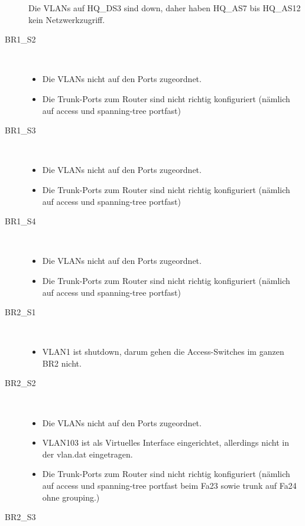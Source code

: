 \begin{description}
	 Die VLANs auf HQ\_DS3 sind down, daher haben HQ\_AS7 bis HQ\_AS12 kein Netzwerkzugriff.
	\item[BR1\_S2] \hfill \\
	  \begin{itemize} 
		  \item Die VLANs nicht auf den Ports zugeordnet.
		  \item Die Trunk-Ports zum Router sind nicht richtig konfiguriert (nämlich auf access und spanning-tree portfast)
	  \end{itemize}
	\item[BR1\_S3] \hfill \\
	  \begin{itemize} 
		  \item Die VLANs nicht auf den Ports zugeordnet. 
		  \item Die Trunk-Ports zum Router sind nicht richtig konfiguriert (nämlich auf access und spanning-tree portfast)
	  \end{itemize}
	\item[BR1\_S4] \hfill \\
	  \begin{itemize} 
		  \item Die VLANs nicht auf den Ports zugeordnet. 
		  \item Die Trunk-Ports zum Router sind nicht richtig konfiguriert (nämlich auf access und spanning-tree portfast)
	  \end{itemize}
	\item[BR2\_S1] \hfill \\
		\begin{itemize}
			\item VLAN1 ist shutdown, darum gehen die Access-Switches im ganzen BR2 nicht.
		\end{itemize}
	\item[BR2\_S2] \hfill \\
	  \begin{itemize}
		  \item Die VLANs nicht auf den Ports zugeordnet.
		  \item VLAN103 ist als Virtuelles Interface eingerichtet, allerdings nicht in der vlan.dat eingetragen.
		  \item Die Trunk-Ports zum Router sind nicht richtig konfiguriert (nämlich auf access und spanning-tree portfast beim Fa23 sowie trunk auf Fa24 ohne grouping.)
		\end{itemize}
	\item[BR2\_S3] \hfill \\

\end{description}
